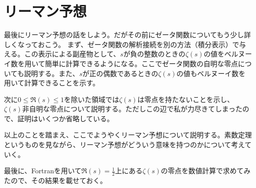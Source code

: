 \documentclass[11pt,b5paper,papersize,dvipdfmx]{jsbook}
\begin{document}


\section{リーマン予想}
\label{sec:4}

最後にリーマン予想の話をしよう。だがその前にゼータ関数についてもう少し詳しくなっておこう。
まず、ゼータ関数の解析接続を別の方法（積分表示）で与える。この表示による副産物として、$s$が負の整数のときの$\zeta(s)$の値をベルヌーイ数を用いて簡単に計算できるようになる。ここでゼータ関数の自明な零点についても説明する。また、$s$が正の偶数であるときの$\zeta(s)$の値もベルヌーイ数を用いて計算できることを示す。\par
次に$0\le \Re(s) \le 1$を除いた領域では$\zeta(s)$は零点を持たないことを示し、$\zeta(s)$非自明な零点について説明する。ただしこの辺で私が力尽きてしまったので、証明はいくつか省略している。\par
以上のことを踏まえ、ここでようやくリーマン予想について説明する。素数定理というものを見ながら、リーマン予想がどういう意味を持つのかについて考えていく。\par
最後に、Fortranを用いて$\Re(s)=\frac12$上にある$\zeta(s)$の零点を数値計算で求めてみたので、その結果を載せておく。

\clearpage
\end{document}

